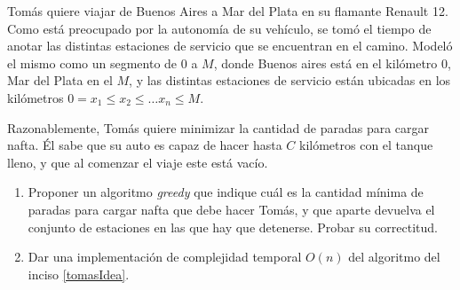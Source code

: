 
\item Tomás quiere viajar de Buenos Aires a Mar del Plata en su flamante Renault 12. Como está preocupado por la autonomía de su vehículo, se tomó el tiempo de anotar las distintas estaciones de servicio que se encuentran en el camino. Modeló el mismo como un segmento de $0$ a $M$, donde Buenos aires está en el kilómetro 0, Mar del Plata en el $M$, y las distintas estaciones de servicio están ubicadas en los kilómetros $0 = x_1 \leq x_2 \leq \ldots x_n \leq M$.

Razonablemente, Tomás quiere minimizar la cantidad de paradas para cargar nafta. Él sabe que su auto es capaz de hacer hasta $C$ kilómetros con el tanque lleno, y que al comenzar el viaje este está vacío.

\begin{enumerate}[label=$\alph*)$,ref=$\alph*)$]
    
    \item Proponer un algoritmo \textit{greedy} que indique cuál es la cantidad mínima de paradas para cargar nafta que debe hacer Tomás, y que aparte devuelva el conjunto de estaciones en las que hay que detenerse. Probar su correctitud.\label{tomasIdea}

    \item Dar una implementación de complejidad temporal $O(n)$ del algoritmo del inciso \ref{tomasIdea}.
\end{enumerate}



